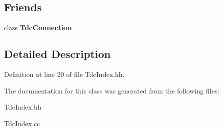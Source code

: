 \subsection*{Friends}
\begin{DoxyCompactItemize}
\item 
class {\bfseries Tdc\-Connection}\label{classCALICE_1_1TdcIndex_ab85618aade64e98c6f7945f78e721566}

\end{DoxyCompactItemize}


\subsection{Detailed Description}


Definition at line 20 of file Tdc\-Index.\-hh.



The documentation for this class was generated from the following files\-:\begin{DoxyCompactItemize}
\item 
Tdc\-Index.\-hh\item 
Tdc\-Index.\-cc\end{DoxyCompactItemize}
